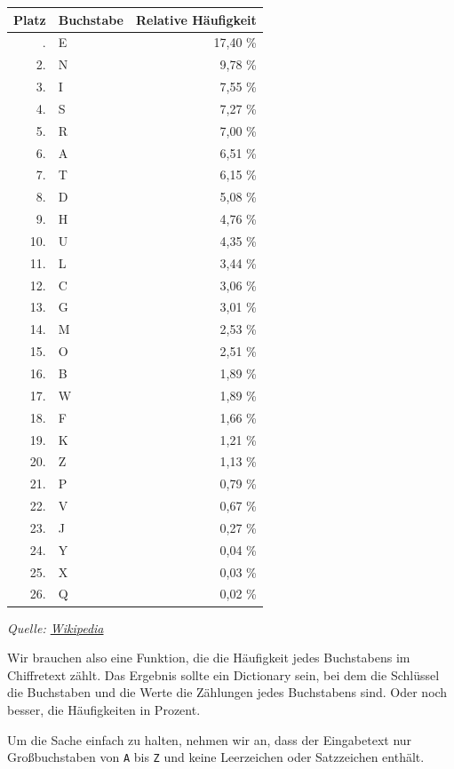 \documentclass[
  nswissgerman,
  a4paper,
  DIV=11,
  numbers=noendperiod,
  ngerman]{scrreprt}
\newcounter{none} %
\begin{document}
{\def\LTcaptype{none} %
\begin{longtable}[]{@{}rlr@{}}
\toprule\noalign{}
Platz & Buchstabe & Relative Häufigkeit \\
\midrule\noalign{}
\endhead
\bottomrule\noalign{}
\endlastfoot
1. & E & 17,40 \% \\
2. & N & 9,78 \% \\
3. & I & 7,55 \% \\
4. & S & 7,27 \% \\
5. & R & 7,00 \% \\
6. & A & 6,51 \% \\
7. & T & 6,15 \% \\
8. & D & 5,08 \% \\
9. & H & 4,76 \% \\
10. & U & 4,35 \% \\
11. & L & 3,44 \% \\
12. & C & 3,06 \% \\
13. & G & 3,01 \% \\
14. & M & 2,53 \% \\
15. & O & 2,51 \% \\
16. & B & 1,89 \% \\
17. & W & 1,89 \% \\
18. & F & 1,66 \% \\
19. & K & 1,21 \% \\
20. & Z & 1,13 \% \\
21. & P & 0,79 \% \\
22. & V & 0,67 \% \\
23. & J & 0,27 \% \\
24. & Y & 0,04 \% \\
25. & X & 0,03 \% \\
26. & Q & 0,02 \% \\
\end{longtable}
}

\emph{Quelle:
\href{https://de.wikipedia.org/wiki/H\%C3\%A4ufigkeitsanalyse}{Wikipedia}}

Wir brauchen also eine Funktion, die die Häufigkeit jedes Buchstabens im
Chiffretext zählt. Das Ergebnis sollte ein Dictionary sein, bei dem die
Schlüssel die Buchstaben und die Werte die Zählungen jedes Buchstabens
sind. Oder noch besser, die Häufigkeiten in Prozent.

Um die Sache einfach zu halten, nehmen wir an, dass der Eingabetext nur
Großbuchstaben von \texttt{A} bis \texttt{Z} und keine Leerzeichen oder
Satzzeichen enthält.
\end{document}
